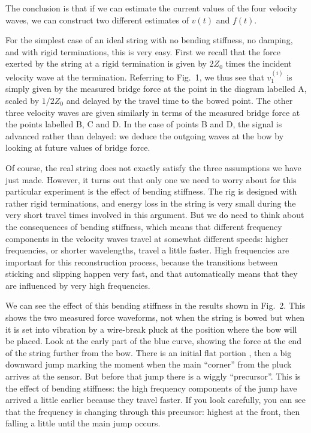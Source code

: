   The conclusion is that if we can estimate the current values of the four 
  velocity waves, we can construct two different estimates of $v(t)$ and 
  $f(t)$. 


  For the simplest case of an ideal string with no bending stiffness, no 
  damping, and with rigid terminations, this is very easy. First we recall that 
  the force exerted by the string at a rigid termination is given by $2Z_0$ 
  times the incident velocity wave at the termination. Referring to Fig.\ 1, we 
  thus see that $v_1^{(i)}$ is simply given by the measured bridge force at the 
  point in the diagram labelled A, scaled by $1/2Z_0$ and delayed by the travel 
  time to the bowed point. The other three velocity waves are given similarly 
  in terms of the measured bridge force at the points labelled B, C and D. In 
  the case of points B and D, the signal is advanced rather than delayed: we 
  deduce the outgoing waves at the bow by looking at future values of bridge 
  force. 

  Of course, the real string does not exactly satisfy the three assumptions we 
  have just made. However, it turns out that only one we need to worry about 
  for this particular experiment is the effect of bending stiffness. The rig is 
  designed with rather rigid terminations, and energy loss in the string is 
  very small during the very short travel times involved in this argument. But 
  we do need to think about the consequences of bending stiffness, which means 
  that different frequency components in the velocity waves travel at somewhat 
  different speeds: higher frequencies, or shorter wavelengths, travel a little 
  faster. High frequencies are important for this reconstruction process, 
  because the transitions between sticking and slipping happen very fast, and 
  that automatically means that they are influenced by very high frequencies. 

  We can see the effect of this bending stiffness in the results shown in Fig.\ 
  2. This shows the two measured force waveforms, not when the string is bowed 
  but when it is set into vibration by a wire-break pluck at the position where 
  the bow will be placed. Look at the early part of the blue curve, showing the 
  force at the end of the string further from the bow. There is an initial flat 
  portion , then a big downward jump marking the moment when the main 
  ``corner'' from the pluck arrives at the sensor. But before that jump there 
  is a wiggly ``precursor''. This is the effect of bending stiffness: the high 
  frequency components of the jump have arrived a little earlier because they 
  travel faster. If you look carefully, you can see that the frequency is 
  changing through this precursor: highest at the front, then falling a little 
  until the main jump occurs. 

